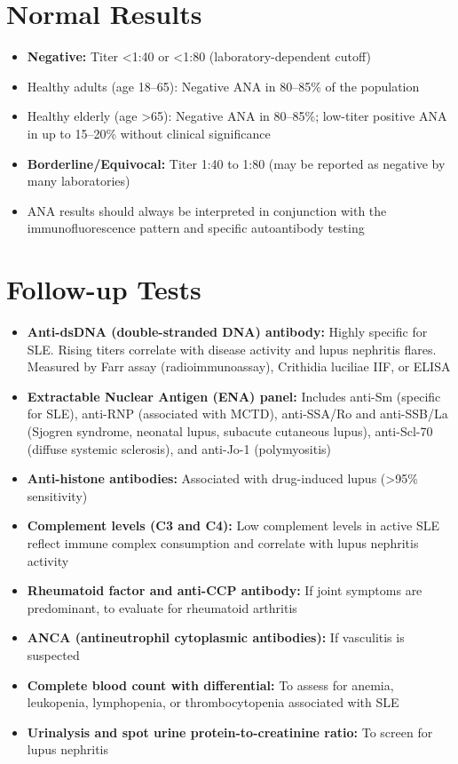 \section*{Normal Results}
\begin{itemize}
  \item \textbf{Negative:} Titer <1:40 or <1:80 (laboratory-dependent cutoff)
  \item Healthy adults (age 18--65): Negative ANA in 80--85\% of the population
  \item Healthy elderly (age >65): Negative ANA in 80--85\%; low-titer positive ANA in up to 15--20\% without clinical significance
  \item \textbf{Borderline/Equivocal:} Titer 1:40 to 1:80 (may be reported as negative by many laboratories)
  \item ANA results should always be interpreted in conjunction with the immunofluorescence pattern and specific autoantibody testing
\end{itemize}

\section*{Follow-up Tests}
\begin{itemize}
  \item \textbf{Anti-dsDNA (double-stranded DNA) antibody:} Highly specific for SLE. Rising titers correlate with disease activity and lupus nephritis flares. Measured by Farr assay (radioimmunoassay), Crithidia luciliae IIF, or ELISA
  \item \textbf{Extractable Nuclear Antigen (ENA) panel:} Includes anti-Sm (specific for SLE), anti-RNP (associated with MCTD), anti-SSA/Ro and anti-SSB/La (Sjogren syndrome, neonatal lupus, subacute cutaneous lupus), anti-Scl-70 (diffuse systemic sclerosis), and anti-Jo-1 (polymyositis)
  \item \textbf{Anti-histone antibodies:} Associated with drug-induced lupus (>95\% sensitivity)
  \item \textbf{Complement levels (C3 and C4):} Low complement levels in active SLE reflect immune complex consumption and correlate with lupus nephritis activity
  \item \textbf{Rheumatoid factor and anti-CCP antibody:} If joint symptoms are predominant, to evaluate for rheumatoid arthritis
  \item \textbf{ANCA (antineutrophil cytoplasmic antibodies):} If vasculitis is suspected
  \item \textbf{Complete blood count with differential:} To assess for anemia, leukopenia, lymphopenia, or thrombocytopenia associated with SLE
  \item \textbf{Urinalysis and spot urine protein-to-creatinine ratio:} To screen for lupus nephritis
\end{itemize}

